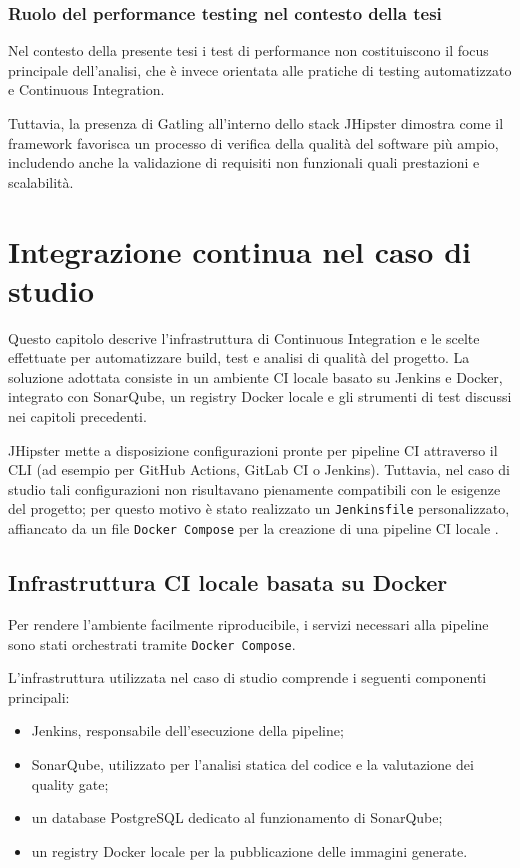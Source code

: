 \subsection{Ruolo del performance testing nel contesto della tesi}

Nel contesto della presente tesi i test di performance non costituiscono il focus principale dell'analisi, che è invece orientata alle pratiche di testing automatizzato e Continuous Integration.

Tuttavia, la presenza di Gatling all'interno dello stack JHipster dimostra come il framework favorisca un processo di verifica della qualità del software più ampio, includendo anche la validazione di requisiti non funzionali quali prestazioni e scalabilità.

\chapter{Integrazione continua nel caso di studio}
\label{cap:ci}

Questo capitolo descrive l’infrastruttura di Continuous Integration e le scelte effettuate per automatizzare build, test e analisi di qualità del progetto. La soluzione adottata consiste in un ambiente CI locale basato su Jenkins e Docker, integrato con SonarQube, un registry Docker locale e gli strumenti di test discussi nei capitoli precedenti.

JHipster mette a disposizione configurazioni pronte per pipeline CI attraverso il CLI (ad esempio per GitHub Actions, GitLab CI o Jenkins). Tuttavia, nel caso di studio tali configurazioni non risultavano pienamente compatibili con le esigenze del progetto; per questo motivo è stato realizzato un \texttt{Jenkinsfile} personalizzato, affiancato da un file \texttt{Docker Compose} per la creazione di una pipeline CI locale \cite{JHipsterDocs,JenkinsDocs,DockerDocs}.

\section{Infrastruttura CI locale basata su Docker}
\label{sec:infra-docker}

Per rendere l'ambiente facilmente riproducibile, i servizi necessari alla pipeline sono stati orchestrati tramite \texttt{Docker Compose}.

L'infrastruttura utilizzata nel caso di studio comprende i seguenti componenti principali:

\begin{itemize}
	\item Jenkins, responsabile dell'esecuzione della pipeline;
	\item SonarQube, utilizzato per l'analisi statica del codice e la valutazione dei quality gate;
	\item un database PostgreSQL dedicato al funzionamento di SonarQube;
	\item un registry Docker locale per la pubblicazione delle immagini generate.
\end{itemize}

